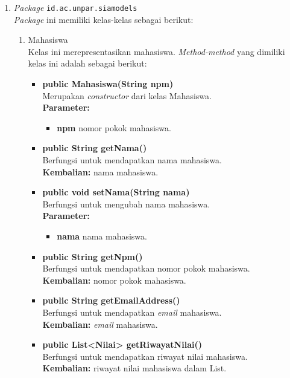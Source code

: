 \begin{enumerate}
	\item \textit{Package} \texttt{id.ac.unpar.siamodels}\\
	\textit{Package} ini memiliki kelas-kelas sebagai berikut:
	\begin{enumerate}
		\item Mahasiswa\\
		Kelas ini merepresentasikan mahasiswa. \textit{Method-method} yang dimiliki kelas ini adalah sebagai berikut:
		\begin{itemize}
			\item \textbf{public Mahasiswa(String npm)}\\
			Merupakan \textit{constructor} dari kelas Mahasiswa.\\
			\textbf{Parameter:}
			\begin{itemize}
				\item \textbf{npm} nomor pokok mahasiswa.
			\end{itemize}
			
			\item \textbf{public String getNama()}\\
				Berfungsi untuk mendapatkan nama mahasiswa.\\
				\textbf{Kembalian:} nama mahasiswa.

			\item \textbf{public void setNama(String nama)}\\
				Berfungsi untuk mengubah nama mahasiswa.\\
				\textbf{Parameter:}
				\begin{itemize}
					\item \textbf{nama} nama mahasiswa.
				\end{itemize}
		
			\item \textbf{public String getNpm()}\\
				Berfungsi untuk mendapatkan nomor pokok mahasiswa.\\
				\textbf{Kembalian:} nomor pokok mahasiswa.
			
			\item \textbf{public String getEmailAddress()}\\
				Berfungsi untuk mendapatkan \textit{email} mahasiswa.\\
				\textbf{Kembalian:} \textit{email} mahasiswa.
			
			\item \textbf{public List<Nilai> getRiwayatNilai()}\\
				Berfungsi untuk mendapatkan riwayat nilai mahasiswa.\\
				\textbf{Kembalian:} riwayat nilai mahasiswa dalam List.
				

\end{itemize}
\end{enumerate}
\end{enumerate}
